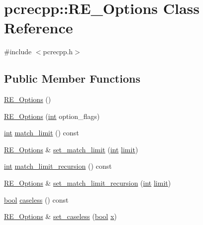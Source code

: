 \hypertarget{classpcrecpp_1_1RE__Options}{}\section{pcrecpp\+:\+:R\+E\+\_\+\+Options Class Reference}
\label{classpcrecpp_1_1RE__Options}


{\ttfamily \#include $<$pcrecpp.\+h$>$}

\subsection*{Public Member Functions}
\begin{DoxyCompactItemize}
\item 
\hyperlink{classpcrecpp_1_1RE__Options_afcde03d8b53ba5bc920e68fa1bc1d2df}{R\+E\+\_\+\+Options} ()
\item 
\hyperlink{classpcrecpp_1_1RE__Options_a19d44d8e522c51467df05b04dabc5e7a}{R\+E\+\_\+\+Options} (\hyperlink{pcre_8txt_a42dfa4ff673c82d8efe7144098fbc198}{int} option\+\_\+flags)
\item 
\hyperlink{pcre_8txt_a42dfa4ff673c82d8efe7144098fbc198}{int} \hyperlink{classpcrecpp_1_1RE__Options_a8700174f05a3aa78cf065e2277492f0c}{match\+\_\+limit} () const 
\item 
\hyperlink{classpcrecpp_1_1RE__Options}{R\+E\+\_\+\+Options} \& \hyperlink{classpcrecpp_1_1RE__Options_a828f0d8a88b62c41d7bac3dc72bd643d}{set\+\_\+match\+\_\+limit} (\hyperlink{pcre_8txt_a42dfa4ff673c82d8efe7144098fbc198}{int} \hyperlink{pcregrep_8txt_a915cb5b6b271c146b5198c51cff16f9a}{limit})
\item 
\hyperlink{pcre_8txt_a42dfa4ff673c82d8efe7144098fbc198}{int} \hyperlink{classpcrecpp_1_1RE__Options_ac001dbbb2f62e6d0723ae9424bd0ecd6}{match\+\_\+limit\+\_\+recursion} () const 
\item 
\hyperlink{classpcrecpp_1_1RE__Options}{R\+E\+\_\+\+Options} \& \hyperlink{classpcrecpp_1_1RE__Options_af8836f5fc0716b6834cace13705e6eb7}{set\+\_\+match\+\_\+limit\+\_\+recursion} (\hyperlink{pcre_8txt_a42dfa4ff673c82d8efe7144098fbc198}{int} \hyperlink{pcregrep_8txt_a915cb5b6b271c146b5198c51cff16f9a}{limit})
\item 
\hyperlink{aplibtool_8c_ad5c9d4ba3dc37783a528b0925dc981a0}{bool} \hyperlink{classpcrecpp_1_1RE__Options_a85aef83eba1f5bcbba2add52642d6d95}{caseless} () const 
\item 
\hyperlink{classpcrecpp_1_1RE__Options}{R\+E\+\_\+\+Options} \& \hyperlink{classpcrecpp_1_1RE__Options_ae0ece5dce73b183ccfdcce2db87e4d97}{set\+\_\+caseless} (\hyperlink{aplibtool_8c_ad5c9d4ba3dc37783a528b0925dc981a0}{bool} \hyperlink{pcregrep_8txt_a4242e9148f20c002763bf4ba53b26ad6}{x})

\end{DoxyCompactItemize}
